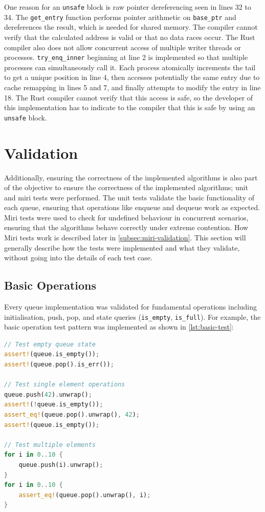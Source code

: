 One reason for an \texttt{unsafe} block is raw pointer dereferencing seen in lines 32 to 34. The \texttt{get\_entry} function performs pointer arithmetic on \texttt{base\_ptr} and dereferences the result, which is needed for shared memory. The compiler cannot verify that the calculated address is valid or that no data races occur. The Rust compiler also does not allow concurrent access of multiple writer threads or processes. \texttt{try\_enq\_inner} beginning at line 2 is implemented so that multiple processes can simultaneously call it. Each process atomically increments the tail to get a unique position in line 4, then accesses potentially the same entry due to cache remapping in lines 5 and 7, and finally attempts to modify the entry in line 18. The Rust compiler cannot verify that this access is safe, so the developer of this implementation has to indicate to the compiler that this is safe by using an \texttt{unsafe} block.

\section{Validation}
Additionally, ensuring the correctness of the implemented algorithms is also part of the objective to ensure the correctness of the implemented algorithms; unit and miri tests were performed. The unit tests validate the basic functionality of each queue, ensuring that operations like enqueue and dequeue work as expected. Miri tests were used to check for undefined behaviour in concurrent scenarios, ensuring that the algorithms behave correctly under extreme contention. How Miri tests work is described later in \cref{subsec:miri-validation}. This section will generally describe how the tests were implemented and what they validate, without going into the details of each test case.

\subsection{Basic Operations}
Every queue implementation was validated for fundamental operations including initialisation, push, pop, and state queries (\texttt{is\_empty}, \texttt{is\_full}). For example, the basic operation test pattern was implemented as shown in \cref{lst:basic-test}:

\begin{lstlisting}[language=Rust, style=boxed, caption={Basic operation test pattern}, label={lst:basic-test}]
// Test empty queue state
assert!(queue.is_empty());
assert!(queue.pop().is_err());

// Test single element operations
queue.push(42).unwrap();
assert!(!queue.is_empty());
assert_eq!(queue.pop().unwrap(), 42);
assert!(queue.is_empty());

// Test multiple elements
for i in 0..10 {
    queue.push(i).unwrap();
}
for i in 0..10 {
    assert_eq!(queue.pop().unwrap(), i);
}
\end{lstlisting}

